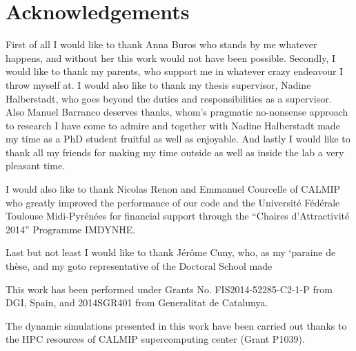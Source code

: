\chapter{Acknowledgements}
	
	First of all I would like to thank Anna Buros who stands by me whatever happens, and without her this work would not have been possible. Secondly, I would like to thank my parents, who support me in whatever crazy endeavour I throw myself at. I would also like to thank my thesis supervisor, Nadine Halberstadt, who goes beyond the duties and responsibilities as a supervisor. Also Manuel Barranco deserves thanks, whom's pragmatic no-nonsense approach to research I have come to admire and together with Nadine Halberstadt made my time as a PhD student fruitful as well as enjoyable. And lastly I would like to thank all my friends for making my time outside as well as inside the lab a very pleasant time. 
	
	I would also like to thank Nicolas Renon and Emmanuel Courcelle of CALMIP who greatly improved the performance of our code and the Universit\'e F\'ed\'erale Toulouse Midi-Pyr\'en\'ees for financial support through the ``Chaires d'Attractivit\'e 2014'' Programme IMDYNHE.
	
	Last but not least I would like to thank Jérôme Cuny, who, as my `paraine de thèse, and my goto representative of the Doctoral School made 
	
	This work has been performed under Grants No. FIS2014-52285-C2-1-P from DGI, Spain, and  2014SGR401 from Generalitat de Catalunya.

	The dynamic simulations presented in this work have been carried out thanks to the HPC resources of CALMIP supercomputing center (Grant P1039).

\clearpage{\pagestyle{empty}\cleardoublepage}